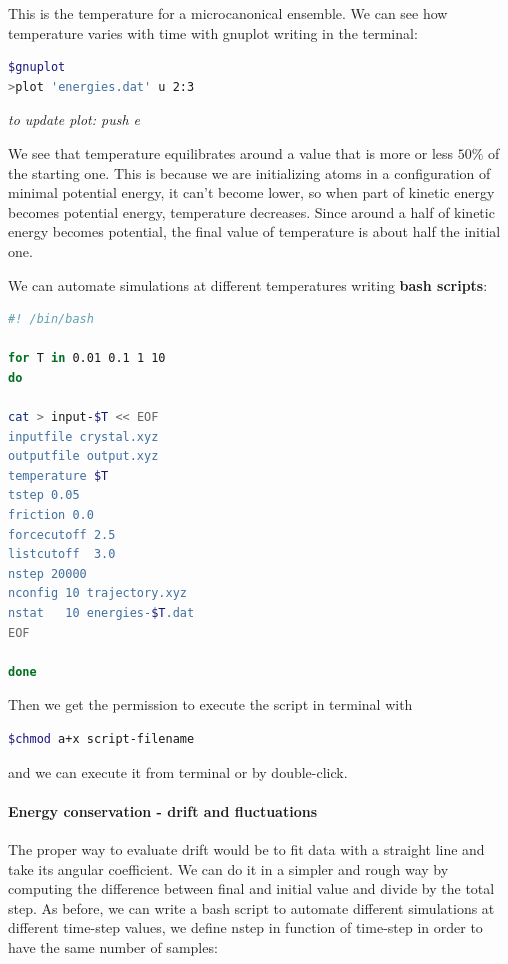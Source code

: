 \documentclass[a4paper, italian, openany]{book}
\begin{document}
This is the temperature for a microcanonical ensemble. We can see how temperature varies with time with gnuplot writing in the terminal:

\begin{lstlisting}[language=bash]
$gnuplot
>plot 'energies.dat' u 2:3
\end{lstlisting}

\textit{to update plot: push e}

\medskip

We see that temperature equilibrates around a value that is more or less $50\%$ of the starting one. This is because we are initializing atoms in a configuration of minimal potential energy, it can't become lower, so when part of kinetic energy becomes potential energy, temperature decreases. Since around a half of kinetic energy becomes potential, the final value of temperature is about half the initial one.

We can automate simulations at different temperatures writing \textbf{bash scripts}:

\begin{lstlisting}[language=bash]
#! /bin/bash

for T in 0.01 0.1 1 10
do

cat > input-$T << EOF
inputfile crystal.xyz
outputfile output.xyz
temperature $T
tstep 0.05
friction 0.0
forcecutoff 2.5
listcutoff  3.0
nstep 20000
nconfig 10 trajectory.xyz
nstat   10 energies-$T.dat
EOF

done
\end{lstlisting}

Then we get the permission to execute the script in terminal with

\begin{lstlisting}[language=bash]
$chmod a+x script-filename
\end{lstlisting}

and we can execute it from terminal or by double-click.

\paragraph{Energy conservation - drift and fluctuations}

The proper way to evaluate drift would be to fit data with a straight line and take its angular coefficient. We can do it in a simpler and rough way by computing the difference between final and initial value and divide by the total step.\newline
As before, we can write a bash script to automate different simulations at different time-step values, we define nstep in function of time-step in order to have the same number of samples:
\end{document}
